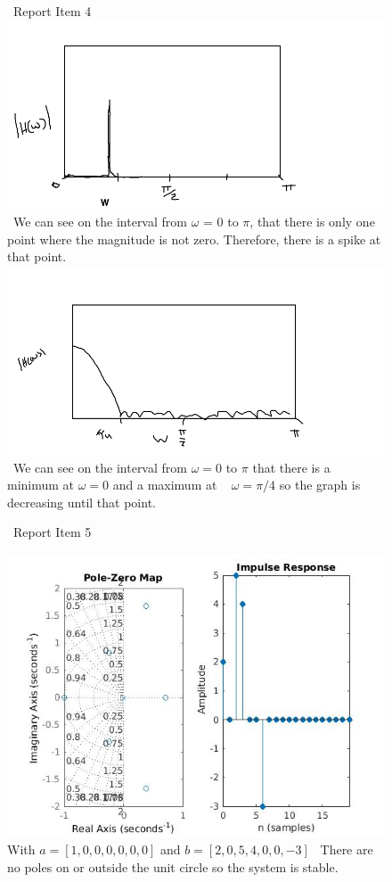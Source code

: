 \documentclass{article}
\begin{document}
\begin{figure}[H]
\ Report Item 4
\includegraphics[scale = .5]{report4_1}
\ We can see on the interval from $\omega$ = $0$ to $\pi$, that there is only one point where the magnitude is not zero. Therefore, there is a spike at that point.
\includegraphics[scale = .5]{report4_2}
\ We can see on the interval from $\omega = 0$ to $\pi $ that there is a minimum at $\omega = 0$ and a maximum at ~ $\omega = \pi/4$ so the graph is decreasing until that point.
\end{figure}

\begin{figure}[H]
\ Report Item 5

\includegraphics[scale = .5]{report5_1}
\\ With $a = [1,0,0,0,0,0,0]$ and $b =[2,0,5,4,0,0,-3]$
\ There are no poles on or outside the unit circle so the system is stable.
\end{figure}
\end{document}
